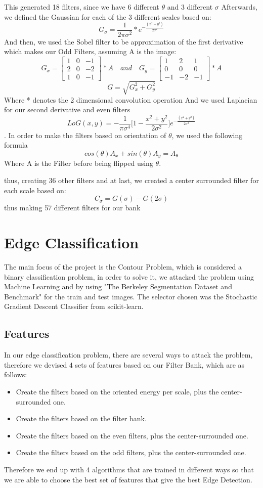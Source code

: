 \documentclass[]{IEEEtran}
\begin{document}
  This generated 18 filters, since we have 6 different $\theta$ and 3 different $\sigma$
  Afterwards, we defined the Gaussian for each of the 3 different scales based on:
 \[ G_\sigma = \frac{1}{2\pi\sigma^2} * e^{-\frac{(x^2 + y^2)}{2\sigma^2}}\]
  And then, we used the Sobel filter to be approximation of the first derivative which makes our Odd Filters, assuming A is the image:
   \[ G_x = \begin{bmatrix} 1 & 0 & -1\\2 & 0 & -2\\1 & 0 & -1\end{bmatrix}*A \quad and \quad G_y = \begin{bmatrix} 1 & 2 & 1\\0 & 0 & 0\\-1 & -2 & -1\end{bmatrix}*A\]
   \[G=\sqrt{G^2_x + G^2_y}\]
   Where * denotes the 2 dimensional convolution operation
  And we used Laplacian for our second derivative and even filters
  \[LoG(x,y) = -\frac{1}{\pi\sigma^4}\Big[1-\frac{x^2 + y^2}{2\sigma^2}\Big]e^{-\frac{(x^2 + y^2)}{2\sigma^2}}\]
  . In order to make the filters based on orientation of $\theta$, we used the following formula
  \[cos(\theta)A_x + sin(\theta)A_y = A_\theta\]
  Where A is the Filter before being flipped using $\theta$. 
  
  thus, creating 36 other filters and at last, we created a center surrounded filter for each scale based on:
  \[C_\sigma = G(\sigma) - G(2\sigma)\]
  thus making 57 different filters for our bank
  
  \section{Edge Classification}
  The main focus of the project is the Contour Problem, which is considered a binary classification problem, in order to solve it, we attacked the problem using Machine Learning and by using "The Berkeley Segmentation Dataset and Benchmark" for the train and test images.
  The selector chosen was the Stochastic Gradient Descent Classifier from scikit-learn.
  \subsection{Features}
 In our edge classification problem, there are several ways to attack the problem, therefore we devised 4 sets of features based on our Filter Bank, which are as follows:
 \begin{itemize}
 \item Create the filters based on the oriented energy per scale, plus the center-surrounded one.
 \item Create the filters based on the filter bank.
 \item Create the filters based on the even filters, plus the center-surrounded one.
 \item Create the filters based on the odd filters, plus the center-surrounded one.
 \end{itemize}
 Therefore we end up with 4 algorithms that are trained in different ways so that we are able to choose the best set of features that give the best Edge Detection.
\end{document}

